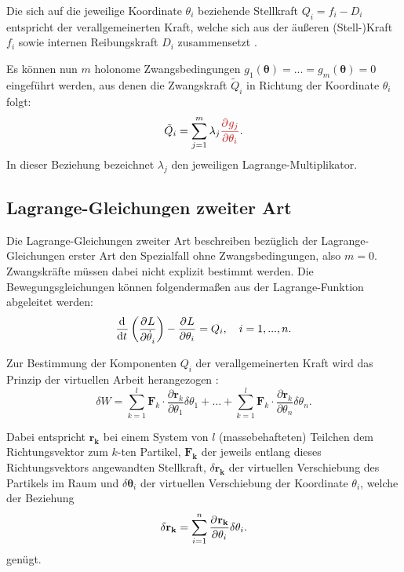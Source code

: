 Die sich auf die jeweilige Koordinate $\theta_i$ beziehende Stellkraft $Q_i = f_i - D_i$ entspricht der verallgemeinerten Kraft, welche sich aus der äußeren (Stell-)Kraft $f_i$ sowie internen Reibungskraft $D_i$ zusammensetzt \cite[S. 49]{Lagrange}.

Es können nun $m$ holonome Zwangsbedingungen $g_1(\boldsymbol{\theta}) = ... = g_m(\boldsymbol{\theta}) = 0$ eingeführt werden, aus denen die Zwangskraft $\tilde{Q}_i$ in Richtung der Koordinate $\theta_i$ folgt:
\begin{equation}
	\tilde{Q}_i = \sum_{j = 1}^m \lambda_j \textcolor{red}{\frac{\partial^{}g_j}{\partial{\theta_i}^{}}}.
\end{equation}
In dieser Beziehung bezeichnet $\lambda_j$ den jeweiligen Lagrange-Multiplikator.

\subsection{Lagrange-Gleichungen zweiter Art}
\label{sec:Lagrange2_theory}
Die Lagrange-Gleichungen zweiter Art beschreiben bezüglich der Lagrange-Gleichungen erster Art den Spezialfall ohne Zwangsbedingungen, also $m = 0$. Zwangskräfte müssen dabei nicht explizit bestimmt werden. Die Bewegungsgleichungen können folgendermaßen aus der Lagrange-Funktion abgeleitet werden:
\begin{equation}
	\label{eq:lagrange2}
	\frac{\mathrm{d}^{}}{\mathrm{d}{t}^{}}\left(\frac{\partial^{}L}{\partial{\dot{\theta}_i}^{}} \right) - \frac{\partial^{}L}{\partial{\theta_i}^{}} = Q_i, \quad i = 1, ..., n.
\end{equation} 

Zur Bestimmung der Komponenten $Q_i$ der verallgemeinerten Kraft wird das Prinzip der virtuellen Arbeit herangezogen \cite{VirtualWork}:
\begin{equation}
	\delta W = \sum_{k=1}^l \mathbf{F}_k \cdot \frac{\partial \mathbf{r}_k}{\partial \theta_1} \delta \theta_1 +\ldots + \sum_{k=1}^l \mathbf{F}_k \cdot \frac{\partial \mathbf{r}_k}{\partial \theta_n} \delta \theta_n.
\end{equation}

Dabei entspricht $\mathbf{r_k}$ bei einem System von $l$ (massebehafteten) Teilchen dem Richtungsvektor zum $k$-ten Partikel, $\mathbf{F_k}$ der jeweils entlang dieses Richtungsvektors angewandten Stellkraft, $\delta \mathbf{r_{k}}$ der virtuellen Verschiebung des Partikels im Raum und $\delta \boldsymbol{\theta}_{i}$ der virtuellen Verschiebung der Koordinate $\theta_i$, welche der Beziehung
\begin{equation}
	\delta \mathbf{r_{k}} = \sum_{i = 1}^{n} \frac{\partial^{}\mathbf{r_{k}}}{\partial{\theta_i}^{}} \delta \theta_i.
\end{equation}
genügt.

